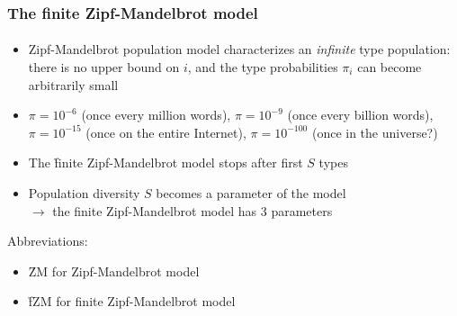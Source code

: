 \documentclass[t]{beamer} %
\begin{document}
\begin{frame}
  \frametitle{The finite Zipf-Mandelbrot model}
  \framesubtitle{\citet{Evert:04}}

  \begin{itemize}
  \item Zipf-Mandelbrot population model characterizes an \emph{infinite} type
    population: there is no upper bound on $i$, and the type probabilities
    $\pi_i$ can become arbitrarily small
  \item $\pi = 10^{-6}$ (once every million words), $\pi = 10^{-9}$ (once
    every billion words), $\pi = 10^{-15}$ (once on the entire Internet), $\pi
    = 10^{-100}$ (once in the universe?)
  \item<2-> The \h{finite Zipf-Mandelbrot} model stops after first $S$
    types
  \item<2-> Population diversity $S$ becomes a parameter of the model\\
    $\to$ the finite Zipf-Mandelbrot model has 3 parameters
  \end{itemize}

  Abbreviations: 
  \begin{itemize}
  \item \h{ZM} for Zipf-Mandelbrot model
  \item \h{fZM} for finite Zipf-Mandelbrot model
  \end{itemize}
\end{frame}
\end{document}
